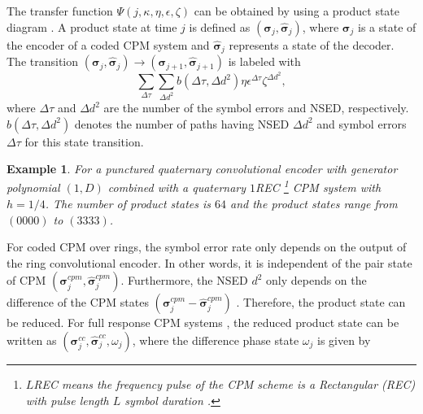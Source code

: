 \documentclass[12pt,twoside,onecolumn,a4paper,english]{IEEEtran2e}
\newtheorem{example}{Example}[section]
\begin{document}
The transfer function $\Psi(j,\kappa,\eta,\epsilon,\zeta)$ can be obtained by using
a product state diagram \cite{Biglieri,productstate}. A product
state at time $j$ is defined as
$({\mathbf{\boldsymbol{\sigma}}}_j,{\mathbf{\boldsymbol{\hat\sigma}}}_j)$,
where ${\mathbf{\boldsymbol{\sigma}}}_j$ is a state of the encoder
of a coded CPM system and ${\mathbf{\boldsymbol{\hat\sigma}}}_j$
represents a state of the decoder. The transition
$({\mathbf{\boldsymbol{\sigma}}}_j,{\mathbf{\boldsymbol{\hat\sigma}}}_j){\rightarrow}
({\mathbf{\boldsymbol{\sigma}}}_{j+1},{\mathbf{\boldsymbol{\hat\sigma}}}_{j+1})$
is labeled with %
\begin{equation}\label{eq:labels}%
 \sum_{\Delta{\tau}}\sum_{\Delta{d^2}}b(\Delta{\tau},\Delta{d^2})\eta{\epsilon^{\Delta{\tau}}}\zeta^{\Delta{d^2}},
\end{equation}
where $\Delta{\tau}$ and $\Delta{d^2}$ are the number of the
symbol errors and NSED, respectively.
$b(\Delta{\tau},\Delta{d^2})$ denotes the number of paths having
NSED $\Delta{d^2}$ and symbol errors $\Delta{\tau}$ for this
state transition.  %

\begin{example}\label{ex:2}
For a punctured quaternary convolutional encoder with generator
polynomial $(1,D)$ combined with a quaternary $1$REC \footnote{$L$REC
means the frequency pulse of the CPM scheme is a Rectangular (REC)
with pulse length $L$ symbol duration \cite{cpm1,cpm2}.}
CPM system with $h=1/4$. %
The number of product states is $64$ and the product states range from $(0000)$ to $(3333)$.
\end{example}

For coded CPM over rings, %
the symbol error rate only depends on the output of
the ring convolutional encoder. In other words, it is independent
of the pair state of CPM
$(\mathbf{\boldsymbol{\sigma}}_j^{cpm},\mathbf{\boldsymbol{\hat\sigma}}_j^{cpm})$.
Furthermore, the NSED $d^2$ only depends on the difference of the CPM
states
$(\mathbf{\boldsymbol{\sigma}}_j^{cpm}-\mathbf{\boldsymbol{\hat\sigma}}_j^{cpm})$
\cite{anderson}. Therefore, the product state can be reduced. %
For full response CPM systems \cite{anderson}, the reduced product
state can be written as
$(\mathbf{\boldsymbol{\sigma}}_j^{cc},\mathbf{\boldsymbol{\hat\sigma}}_j^{cc},\omega_j)$,
where the difference phase state $\omega_j$ is given by
\end{document}

